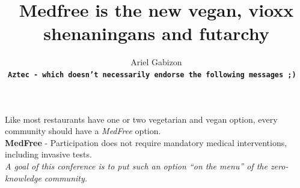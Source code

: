 \documentclass[shadesubsections,compress,14pt,mathserif]{beamer}
\title{\large{Medfree is the new vegan, vioxx shenaningans and futarchy}}    %
\author{\small{Ariel Gabizon}\\                 %
\tt{\footnotesize{\textbf{Aztec - which doesn't necessarily endorse the following messages ;)} }}  }
\newcommand{\nl}{\\ \pause \vspace{0.2in}}
\begin{document}
\boldmath
\begin{frame}
\maketitle
\end{frame}



\begin{frame}
Like most restaurants have one or two vegetarian and vegan option, every community
should have a \emph{MedFree} option.\nl
\textbf{MedFree} - Participation does not require mandatory medical interventions, including invasive tests.\nl
\emph{A goal of this conference is to put such an option ``on the menu'' of the zero-knowledge community.}
\end{frame}
\end{document}
